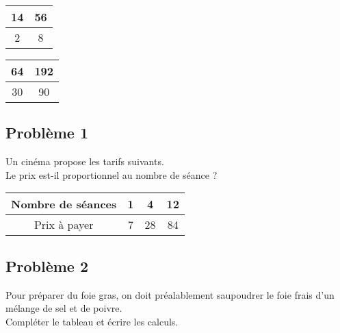 \begin{multicols}{2}\noindent 
  \begin{center}\begin{tabular}{|c|c|}  \hline
    14 & 56 \\  \hline
    2 & 8 \\  \hline
  \end{tabular}\end{center}

  \Pointilles[5]  \columnbreak 

  \begin{center}\begin{tabular}{|c|c|} \hline
    64 & 192 \\  \hline
    30 & 90 \\  \hline
  \end{tabular}\end{center}

  \Pointilles[5] 

\end{multicols}

\newpage

\subsection*{Problème 1}

\begin{multicols}{2}\noindent

Un cinéma propose les tarifs suivants. \\
Le prix est-il proportionnel au nombre de séance ?


\begin{center}\begin{tabular}{|c|c|c|c|} \hline
  Nombre de séances & 1 &  4 & 12 \\  \hline
  Prix à payer      & 7 & 28 & 84\\  \hline
\end{tabular}\end{center}  \columnbreak 

\Pointilles[5] 

\end{multicols}

\subsection*{Problème 2}

Pour préparer du foie gras, on doit préalablement saupoudrer le foie frais d'un mélange de sel et de poivre. \\
Compléter le tableau et écrire les calculs.

